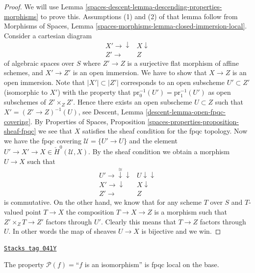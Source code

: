 \begin{proof}
We will use
Lemma \ref{spaces-descent-lemma-descending-properties-morphisms}
to prove this. Assumptions (1) and (2) of that lemma follow from
Morphisms of Spaces,
Lemma \ref{spaces-morphisms-lemma-closed-immersion-local}.
Consider a cartesian diagram
$$
\begin{array}{cc}X' \longrightarrow\downarrow & X \downarrow \\ Z' \longrightarrow & Z\end{array}
$$
of algebraic spaces over $S$
where $Z' \to Z$ is a surjective flat morphism of affine schemes,
and $X' \to Z'$ is an open immersion. We have to show that $X \to Z$
is an open immersion. Note that $|X'| \subset |Z'|$ corresponds to an
open subscheme $U' \subset Z'$ (isomorphic to $X'$)
with the property that $\text{pr}_0^{-1}(U') = \text{pr}_1^{-1}(U')$
as open subschemes of $Z' \times_Z Z'$. Hence there exists an open
subscheme $U \subset Z$ such that $X' = (Z' \to Z)^{-1}(U)$, see
Descent, Lemma \ref{descent-lemma-open-fpqc-covering}.
By Properties of Spaces,
Proposition \ref{spaces-properties-proposition-sheaf-fpqc}
we see that $X$ satisfies the sheaf condition for the fpqc topology.
Now we have the fpqc covering $\mathcal{U} = \{U' \to U\}$
and the element $U' \to X' \to X \in \check{H}^0(\mathcal{U}, X)$.
By the sheaf condition we obtain a morphism $U \to X$ such that
$$
\begin{array}{cc}U' \longrightarrow\overset{\cong}{\downarrow}\downarrow & U \downarrow\downarrow \\ X' \longrightarrow\downarrow & X \downarrow \\ Z' \longrightarrow & Z\end{array}
$$
is commutative. On the other hand, we know that for any scheme $T$ over $S$
and $T$-valued point $T \to X$ the composition $T \to X \to Z$ is a
morphism such that $Z' \times_Z T \to Z'$ factors through $U'$. Clearly
this means that $T \to Z$ factors through $U$. In other words the map
of sheaves $U \to X$ is bijective and we win.
\end{proof}

\begin{lemma}
\label{spaces-descent-lemma-descending-property-isomorphism}
\href{https://stacks.math.columbia.edu/tag/041Y}{\texttt{Stacks tag 041Y}}

The property $\mathcal{P}(f) =$``$f$ is an isomorphism''
is fpqc local on the base.
\end{lemma}


